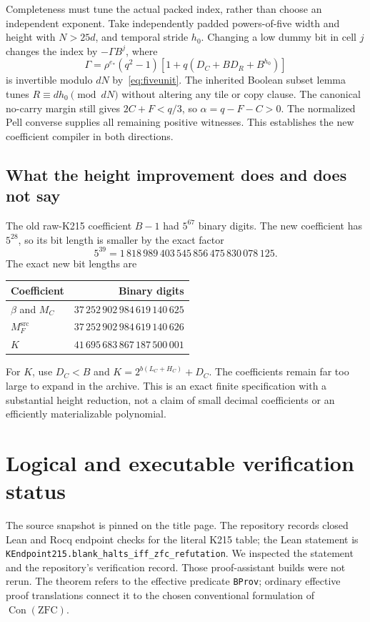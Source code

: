 \documentclass[11pt,a4paper]{article}
\theoremstyle{remark}\newtheorem{remark}[theorem]{Remark}
\newcommand{\Con}{\operatorname{Con}}
\newcommand{\file}[1]{\nolinkurl{#1}}
\newcommand{\Msrc}{M_F^{\mathrm{src}}}
\begin{document}
Completeness must tune the actual packed index, rather than choose an
independent exponent. Take independently padded powers-of-five width
and height with \(N>25d\), and temporal stride \(h_0\). Changing a
low dummy bit in cell \(j\) changes the index by \(-\Gamma B^j\),
where
\[
 \Gamma=\rho^{e_*}(q^2-1)
       [1+q(D_C+BD_R+B^{h_0})]
\]
is invertible modulo \(dN\) by~\eqref{eq:fiveunit}. The inherited
Boolean subset lemma tunes \(R\equiv dh_0\pmod{dN}\) without
altering any tile or copy clause. The canonical no-carry margin still
gives \(2C+F<q/3\), so \(\alpha=q-F-C>0\).
The normalized Pell converse supplies all remaining positive witnesses.
This establishes the new coefficient compiler in both directions.

\subsection{What the height improvement does and does not say}
The old raw-K215 coefficient \(B-1\) had \(5^{67}\) binary digits.
The new coefficient has \(5^{28}\), so its bit length is smaller by
the exact factor
\[
 5^{39}=1\,818\,989\,403\,545\,856\,475\,830\,078\,125.
\]
The exact new bit lengths are
\begin{center}
\begin{tabular}{lr}
\toprule
Coefficient & Binary digits\\
\midrule
\(\beta\) and \(M_C\) & \(37\,252\,902\,984\,619\,140\,625\)\\
\(\Msrc\) & \(37\,252\,902\,984\,619\,140\,626\)\\
\(K\) & \(41\,695\,683\,867\,187\,500\,001\)\\
\bottomrule
\end{tabular}
\end{center}
For \(K\), use \(D_C<B\) and
\(K=2^{b(L_C+H_C)}+D_C\). The coefficients remain far too large to
expand in the archive. This is an exact finite specification with a
substantial height reduction, not a claim of small decimal coefficients
or an efficiently materializable polynomial.

\section{Logical and executable verification status}\label{sec:status}
The source snapshot is pinned on the title page. The repository records
closed Lean and Rocq endpoint checks for the literal K215 table; the
Lean statement is
\file{KEndpoint215.blank_halts_iff_zfc_refutation}. We inspected the
statement and the repository's verification record. Those proof-assistant
builds were not rerun. The theorem refers to the effective predicate
\file{BProv}; ordinary effective proof translations connect it to the
chosen conventional formulation of \(\Con(\mathrm{ZFC})\).
\end{document}
